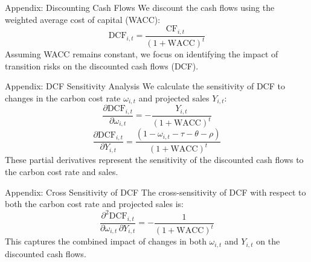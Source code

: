 \documentclass{beamer}
\begin{document}
\begin{frame}{Appendix: Discounting Cash Flows}
  We discount the cash flows using the weighted average cost of capital (WACC):
  \begin{equation}
    \text{DCF}_{i,t} = \frac{\text{CF}_{i,t}}{(1 + \text{WACC})^t}
  \end{equation}
  Assuming WACC remains constant, we focus on identifying the impact of transition risks on the discounted cash flows (DCF).
\end{frame}

\begin{frame}{Appendix: DCF Sensitivity Analysis}
  We calculate the sensitivity of DCF to changes in the carbon cost rate $\omega_{i,t}$ and projected sales $Y_{i,t}$:
  \begin{equation}
    \frac{\partial \text{DCF}_{i,t}}{\partial \omega_{i,t}} = -\frac{Y_{i,t}}{(1 + \text{WACC})^t}
  \end{equation}
  \begin{equation}
    \frac{\partial \text{DCF}_{i,t}}{\partial Y_{i,t}} = \frac{(1 - \omega_{i,t} - \tau - \theta - \rho)}{(1 + \text{WACC})^t}
  \end{equation}
  These partial derivatives represent the sensitivity of the discounted cash flows to the carbon cost rate and sales.
\end{frame}

\begin{frame}{Appendix: Cross Sensitivity of DCF}
  The cross-sensitivity of DCF with respect to both the carbon cost rate and projected sales is:
  \begin{equation}
    \frac{\partial^2 \text{DCF}_{i,t}}{\partial \omega_{i,t} \, \partial Y_{i,t}} = -\frac{1}{(1 + \text{WACC})^t}
  \end{equation}
  This captures the combined impact of changes in both $\omega_{i,t}$ and $Y_{i,t}$ on the discounted cash flows.
\end{frame}
\end{document}
